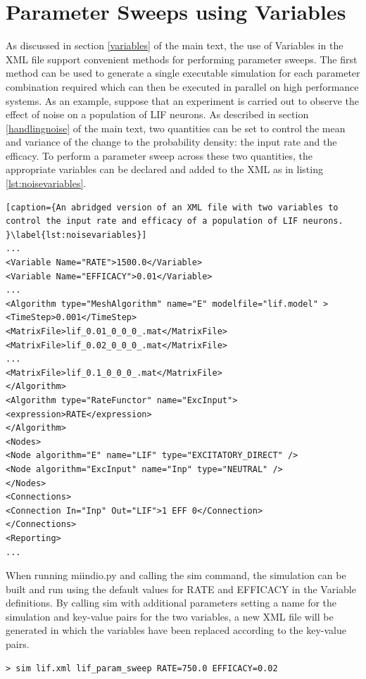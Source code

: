 \documentclass[utf8]{frontiers_suppmat} %
\begin{document}
\section{Parameter Sweeps using Variables}
\label{parametersweeps}
As discussed in section \ref{variables} of the main text, the use of Variables in the XML file support convenient methods for performing parameter sweeps. The first method can be used to generate a single executable simulation for each parameter combination required which can then be executed in parallel on high performance systems. As an example, suppose that an experiment is carried out to observe the effect of noise on a population of LIF neurons. As described in section \ref{handlingnoise} of the main text, two quantities can be set to control the mean and variance of the change to the probability density: the input rate and the efficacy. To perform a parameter sweep across these two quantities, the appropriate variables can be declared and added to the XML as in listing \ref{lst:noisevariables}.

\begin{lstlisting}[caption={An abridged version of an XML file with two variables to control the input rate and efficacy of a population of LIF neurons.  }\label{lst:noisevariables}]
...
<Variable Name="RATE">1500.0</Variable>
<Variable Name="EFFICACY">0.01</Variable>
...
<Algorithm type="MeshAlgorithm" name="E" modelfile="lif.model" >
<TimeStep>0.001</TimeStep>
<MatrixFile>lif_0.01_0_0_0_.mat</MatrixFile>
<MatrixFile>lif_0.02_0_0_0_.mat</MatrixFile>
...
<MatrixFile>lif_0.1_0_0_0_.mat</MatrixFile>
</Algorithm>
<Algorithm type="RateFunctor" name="ExcInput">
<expression>RATE</expression>
</Algorithm>
<Nodes>
<Node algorithm="E" name="LIF" type="EXCITATORY_DIRECT" />
<Node algorithm="ExcInput" name="Inp" type="NEUTRAL" />
</Nodes>
<Connections>
<Connection In="Inp" Out="LIF">1 EFF 0</Connection>
</Connections>
<Reporting>
...
\end{lstlisting}

When running miindio.py and calling the sim command, the simulation can be built and run using the default values for RATE and EFFICACY in the Variable definitions. By calling sim with additional parameters setting a name for the simulation and key-value pairs for the two variables, a new XML file will be generated in which the variables have been replaced according to the key-value pairs.

\begin{lstlisting}
> sim lif.xml lif_param_sweep RATE=750.0 EFFICACY=0.02
\end{lstlisting}
\end{document}
